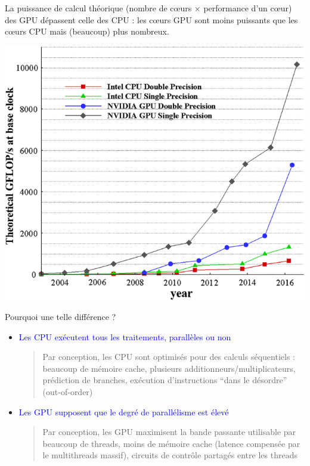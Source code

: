 \documentclass[usenames,dvipsnames]{beamer}
\begin{document}
\begin{frame}

\vfill
La puissance de calcul théorique (nombre de c\oe urs $\times$ performance d'un c\oe ur) des GPU dépassent celle des CPU : les c\oe urs GPU sont moins puissants que les c\oe urs CPU mais (beaucoup) plus nombreux.

\begin{center}
\includegraphics[scale=0.3]{../../Images/Perf_CPU_GPU}
\end{center}
\vfill
\end{frame}

\begin{frame}
	Pourquoi une telle différence ?
	\vfill
	\begin{itemize}
		\item \textcolor{blue}{Les CPU exécutent tous les traitements, parallèles ou non}
		
	\vfill
		\begin{quote}
		Par conception, les CPU sont optimisés pour des calculs séquentiels : beaucoup de mémoire cache, plusieurs additionneurs/multiplicateurs, prédiction de branches, exécution d'instructions ``dans le désordre'' (out-of-order)
		 \end{quote}
	 
	 \vfill
		\item \textcolor{blue}{Les GPU supposent que le degré de parallélisme est élevé}
		
	\vfill
		\begin{quote}
        Par conception, les GPU maximisent la bande passante utilisable par beaucoup de threads, moins de mémoire cache (latence compensée par le multithreads massif), circuits de contrôle partagés entre les threads
   		\end{quote}
	
		
	\end{itemize}
\end{frame}
\end{document}
